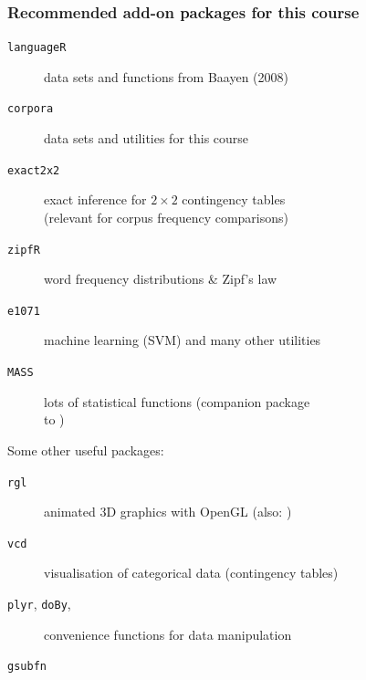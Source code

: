\documentclass[t]{beamer} %
\begin{document}
\begin{frame}
  \frametitle{Recommended add-on packages for this course}

  \begin{description}
  \item[\texttt{languageR}] data sets and functions from Baayen (2008)
  \item[\texttt{corpora}] data sets and utilities for this course
  \item[\texttt{exact2x2}] exact inference for $2\times 2$ contingency
    tables\\ (relevant for corpus frequency comparisons)
  \item[\texttt{zipfR}] word frequency distributions \& Zipf's law
  \item[\texttt{e1071}] machine learning (SVM) and many other utilities
  \item[\texttt{MASS}] lots of statistical functions (companion package\\
    to )
  \end{description}

  \gap[.5]
  Some other useful packages:
  \begin{description}
  \item[\texttt{rgl}] animated 3D graphics with OpenGL (also: )
  \item[\texttt{vcd}] visualisation of categorical data (contingency tables)
  \item[\texttt{plyr}, \texttt{doBy},] convenience functions for data manipulation
  \item[\texttt{gsubfn}]
  \end{description}
\end{frame}
\end{document}
